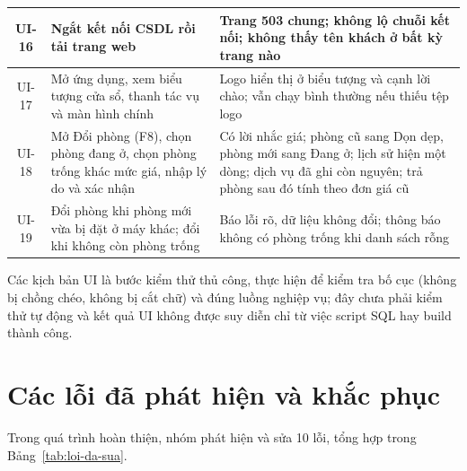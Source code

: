 \documentclass[14pt]{report}
\begin{document}
\begin{longtable}{|c|p{5.5cm}|p{5.3cm}|}
UI-16 & Ngắt kết nối CSDL rồi tải trang web & Trang 503 chung; không lộ chuỗi kết nối; không thấy tên khách ở bất kỳ trang nào \\\hline
UI-17 & Mở ứng dụng, xem biểu tượng cửa sổ, thanh tác vụ và màn hình chính & Logo hiển thị ở biểu tượng và cạnh lời chào; vẫn chạy bình thường nếu thiếu tệp logo \\\hline
UI-18 & Mở Đổi phòng (F8), chọn phòng đang ở, chọn phòng trống khác mức giá, nhập lý do và xác nhận & Có lời nhắc giá; phòng cũ sang Dọn dẹp, phòng mới sang Đang ở; lịch sử hiện một dòng; dịch vụ đã ghi còn nguyên; trả phòng sau đó tính theo đơn giá cũ \\\hline
UI-19 & Đổi phòng khi phòng mới vừa bị đặt ở máy khác; đổi khi không còn phòng trống & Báo lỗi rõ, dữ liệu không đổi; thông báo không có phòng trống khi danh sách rỗng \\\hline
\end{longtable}

Các kịch bản UI là bước kiểm thử thủ công, thực hiện để kiểm tra bố cục (không bị chồng chéo, không bị cắt chữ) và đúng luồng nghiệp vụ; đây chưa phải kiểm thử tự động và kết quả UI không được suy diễn chỉ từ việc script SQL hay build thành công.

\section{Các lỗi đã phát hiện và khắc phục}

Trong quá trình hoàn thiện, nhóm phát hiện và sửa 10 lỗi, tổng hợp trong Bảng~\ref{tab:loi-da-sua}.
\end{document}
